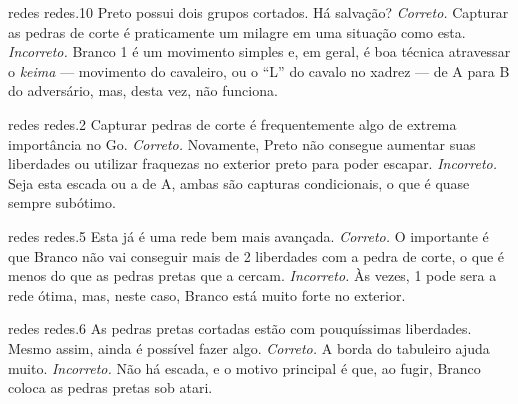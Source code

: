 \problemAnswerDiagram
  {redes}
  {redes.10}
  {Preto possui dois grupos cortados. Há salvação?}
  {\emph{Correto.} Capturar as pedras de corte é praticamente um milagre em uma situação como esta.}
  {\emph{Incorreto.} Branco 1 é um movimento simples e, em geral, é boa técnica atravessar o \emph{keima} --- movimento do cavaleiro, ou o ``L'' do cavalo no xadrez --- de A para B do adversário, mas, desta vez, não funciona.}

\problemAnswerDiagram
  {redes}
  {redes.2}
  {Capturar pedras de corte é frequentemente algo de extrema importância no Go.}
  {\emph{Correto.} Novamente, Preto não consegue aumentar suas liberdades ou utilizar fraquezas no exterior preto para poder escapar.}
  {\emph{Incorreto.} Seja esta escada ou a de A, ambas são capturas condicionais, o que é quase sempre subótimo.}

\problemAnswerDiagram
  {redes}
  {redes.5}
  {Esta já é uma rede bem mais avançada.}
  {\emph{Correto.} O importante é que Branco não vai conseguir mais de 2 liberdades com a pedra de corte, o que é menos do que as pedras pretas que a cercam.}
  {\emph{Incorreto.} Às vezes, 1 pode sera a rede ótima, mas, neste caso, Branco está muito forte no exterior.}

\problemAnswerDiagram
  {redes}
  {redes.6}
  {As pedras pretas cortadas estão com pouquíssimas liberdades. Mesmo assim, ainda é possível fazer algo.}
  {\emph{Correto.} A borda do tabuleiro ajuda muito.}
  {\emph{Incorreto.} Não há escada, e o motivo principal é que, ao fugir, Branco coloca as pedras pretas sob atari.}